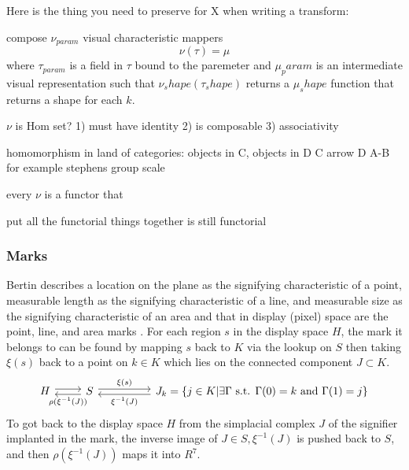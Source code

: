 \documentclass[../main.tex]{subfiles}
\begin{document}
Here is the thing you need to preserve for {X} when writing a transform:


compose $\nu_{param}$ visual characteristic mappers
\begin{equation}
    \nu(\tau) = \mu
\end{equation}
where $\tau_{param}$ is a field in $\tau$ bound to the paremeter and $\mu_param$ is an intermediate visual representation such that $\nu_shape(\tau_shape)$ returns a $\mu_shape$ function that returns a shape for each $k$.


$\nu$ is Hom set? 
1) must have identity
2) is composable
3) associativity 

homomorphism in land of categories:
objects in C, objects in D
C arrow D
 A-B for example stephens group scale

every $\nu$ is a functor that

put all the functorial things together is still functorial 


\subsubsection{Marks}
Bertin describes a location on the plane as the signifying characteristic of a point, measurable length as the signifying characteristic of a line, and measurable size as the signifying characteristic of an area and that in display (pixel) space are the point, line, and area marks \cite{bertinIIPropertiesGraphic2011,carpendaleVisualRepresentationSemiology}. For each region $s$ in the display space $H$, the mark it belongs to can be found by mapping $s$ back to $K$ via the lookup on $S$ then taking $\xi(s)$ back to a point on $k \in K$ which lies on the connected component $J \subset K$. 
\begin{equation}
\begin{tikzcd}
    H \arrow[r, shift left] & S \arrow[l, "\rho(\xi^{-1}(J))", shift left] \arrow[rr, "\xi(s)", shift left] &  & J_{k} =  \{j \in K| \exists \Gamma \text{ s.t. } \Gamma(0)=k \text{ and }\Gamma(1)=j\} \arrow[ll, "\xi^{-1}(J)", shift left]
\end{tikzcd}
\label{eq:mark}
\end{equation}
To got back to the display space $H$  from the simplacial complex $J$ of the signifier implanted in the mark, the inverse image of $J \in S, \xi^{-1}(J)$ is pushed back to $S$, and then  $\rho(\xi^{-1}(J))$ maps it into $R^{7}$. 
\end{document}
